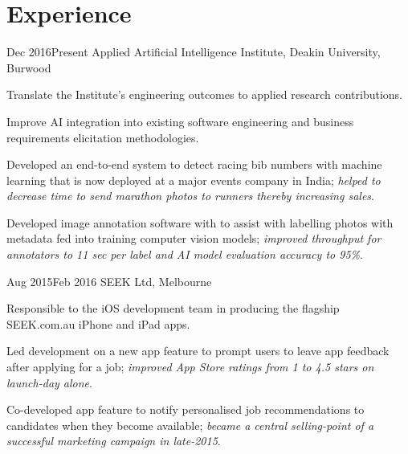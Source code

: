 \vspace{-1.5mm}
\section{Experience}
\vspace{3mm}

\def \asis{A\textsuperscript{2}I\textsuperscript{2}}

{Dec 2016}{Present}
{Applied Artificial Intelligence Institute, Deakin University, Burwood}
{
  \item Translate the Institute's engineering outcomes to applied research contributions.
  \item Improve AI integration into existing software engineering and business requirements elicitation methodologies.
}
{
  \item Developed an end-to-end system to detect racing bib numbers with machine learning that is now deployed at a major events company in India; \textit{helped to decrease time to send marathon photos to runners thereby increasing sales}.
  \item Developed image annotation software with to assist with labelling photos with metadata fed into training computer vision models; \textit{improved throughput for annotators to 11 sec per label and AI model evaluation accuracy to 95\%}.
}

{Aug 2015}{Feb 2016}
{SEEK Ltd, Melbourne}
{
  \item Responsible to the iOS development team in producing the flagship SEEK.com.au iPhone and iPad apps.
}
{
  \item Led development on a new app feature to prompt users to leave app feedback after applying for a job; \textit{improved App Store ratings from 1  to 4.5 stars on launch-day alone}.
  \item Co-developed app feature to notify personalised job recommendations to candidates when they become available; \textit{became a central selling-point of a successful marketing campaign in late-2015}.
}

